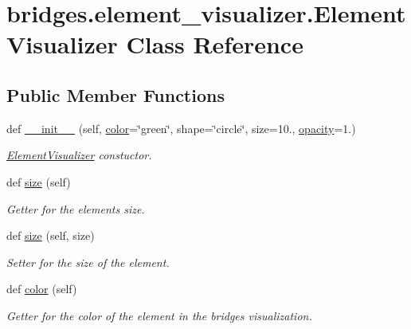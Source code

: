 \hypertarget{classbridges_1_1element__visualizer_1_1_element_visualizer}{}\section{bridges.\+element\+\_\+visualizer.\+Element\+Visualizer Class Reference}
\label{classbridges_1_1element__visualizer_1_1_element_visualizer}
\subsection*{Public Member Functions}
\begin{DoxyCompactItemize}
\item 
def \hyperlink{classbridges_1_1element__visualizer_1_1_element_visualizer_a27ee5eddf78bac93e2702b2f2203518a}{\+\_\+\+\_\+init\+\_\+\+\_\+} (self, \hyperlink{classbridges_1_1element__visualizer_1_1_element_visualizer_a1fd985698e1c56289ed49fa7849d43ab}{color}=\char`\"{}green\char`\"{}, shape=\char`\"{}circle\char`\"{}, size=10., \hyperlink{classbridges_1_1element__visualizer_1_1_element_visualizer_a64288f56aa9cb5f3ccf703d696df1c04}{opacity}=1.)
\begin{DoxyCompactList}\small\item\em \hyperlink{classbridges_1_1element__visualizer_1_1_element_visualizer}{Element\+Visualizer} constuctor. \end{DoxyCompactList}\item 
def \hyperlink{classbridges_1_1element__visualizer_1_1_element_visualizer_ad3a1c448194330f7122c31f68ed44d49}{size} (self)
\begin{DoxyCompactList}\small\item\em Getter for the elements size. \end{DoxyCompactList}\item 
def \hyperlink{classbridges_1_1element__visualizer_1_1_element_visualizer_adee6d74f47355b75634a9fd5d0ae1714}{size} (self, size)
\begin{DoxyCompactList}\small\item\em Setter for the size of the element. \end{DoxyCompactList}\item 
def \hyperlink{classbridges_1_1element__visualizer_1_1_element_visualizer_acb214c900f5e13f694aa04f284ec55e2}{color} (self)
\begin{DoxyCompactList}\small\item\em Getter for the color of the element in the bridges visualization. \end{DoxyCompactList}\item 

\end{DoxyCompactItemize}
